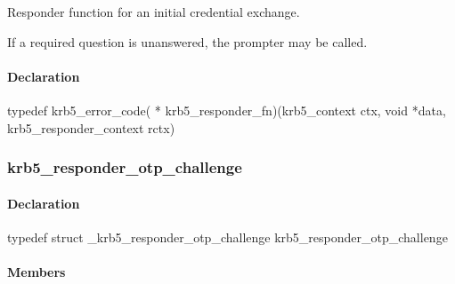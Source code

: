 \documentclass[letterpaper,10pt,english]{sphinxmanual}
\begin{document}
Responder function for an initial credential exchange.

If a required question is unanswered, the prompter may be called.


\paragraph{Declaration}
\label{appdev/refs/types/krb5_responder_fn:declaration}
typedef krb5\_error\_code( * krb5\_responder\_fn)(krb5\_context ctx, void *data, krb5\_responder\_context rctx)


\subsubsection{krb5\_responder\_otp\_challenge}
\label{appdev/refs/types/krb5_responder_otp_challenge:krb5-responder-otp-challenge}\label{appdev/refs/types/krb5_responder_otp_challenge:krb5-responder-otp-challenge-struct}\label{appdev/refs/types/krb5_responder_otp_challenge::doc}

\begin{fulllineitems}
\label{appdev/refs/types/krb5_responder_otp_challenge:krb5_responder_otp_challenge}
\end{fulllineitems}



\paragraph{Declaration}
\label{appdev/refs/types/krb5_responder_otp_challenge:declaration}
typedef struct \_krb5\_responder\_otp\_challenge  krb5\_responder\_otp\_challenge


\paragraph{Members}
\label{appdev/refs/types/krb5_responder_otp_challenge:members}

\begin{fulllineitems}
\label{appdev/refs/types/krb5_responder_otp_challenge:krb5_responder_otp_challenge.service}
\end{fulllineitems}

\end{document}
